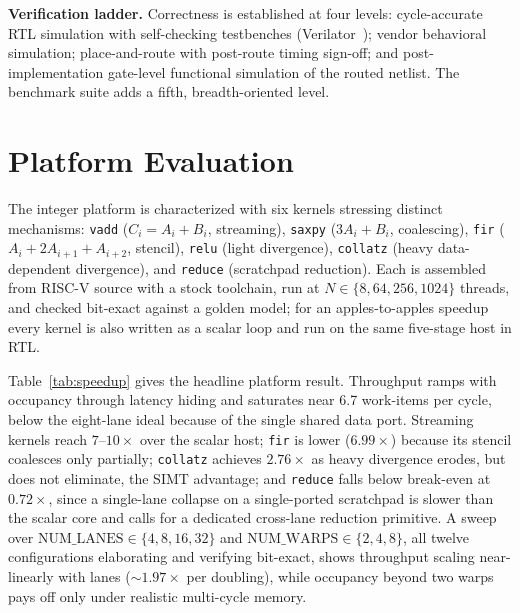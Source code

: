 \documentclass[10pt,conference]{IEEEtran}
\begin{document}
\textbf{Verification ladder.} Correctness is established at four levels:
cycle-accurate RTL simulation with self-checking testbenches
(Verilator~\cite{verilator}); vendor behavioral simulation; place-and-route with
post-route timing sign-off; and post-implementation gate-level functional
simulation of the routed netlist. The benchmark suite adds a fifth,
breadth-oriented level.

\section{Platform Evaluation}\label{sec:results}
The integer platform is characterized with six kernels stressing distinct
mechanisms: \texttt{vadd} ($C_i=A_i+B_i$, streaming), \texttt{saxpy}
($3A_i+B_i$, coalescing), \texttt{fir} ($A_i+2A_{i+1}+A_{i+2}$, stencil),
\texttt{relu} (light divergence), \texttt{collatz} (heavy data-dependent
divergence), and \texttt{reduce} (scratchpad reduction). Each is assembled from
RISC-V source with a stock toolchain, run at $N\in\{8,64,256,1024\}$ threads, and
checked bit-exact against a golden model; for an apples-to-apples speedup every
kernel is also written as a scalar loop and run on the same five-stage host in
RTL.

Table~\ref{tab:speedup} gives the headline platform result. Throughput ramps with
occupancy through latency hiding and saturates near 6.7 work-items per cycle,
below the eight-lane ideal because of the single shared data port. Streaming
kernels reach $7$--$10\times$ over the scalar host; \texttt{fir} is lower
($6.99\times$) because its stencil coalesces only partially; \texttt{collatz}
achieves $2.76\times$ as heavy divergence erodes, but does not eliminate, the SIMT
advantage; and \texttt{reduce} falls below break-even at $0.72\times$, since a
single-lane collapse on a single-ported scratchpad is slower than the scalar core
and calls for a dedicated cross-lane reduction primitive. A sweep over
$\mathrm{NUM\_LANES}\in\{4,8,16,32\}$ and $\mathrm{NUM\_WARPS}\in\{2,4,8\}$, all
twelve configurations elaborating and verifying bit-exact, shows throughput
scaling near-linearly with lanes ($\sim\!1.97\times$ per doubling), while
occupancy beyond two warps pays off only under realistic multi-cycle memory.
\end{document}
